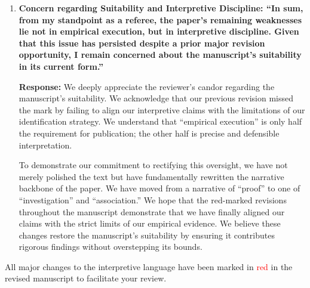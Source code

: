 \documentclass[12pt]{article}
\begin{document}
\begin{enumerate}
    \begin{responsebox}
    \vspace{0.5cm}
    \textbf{Response:} We understood that a fundamental shift in stance was required, not just minor edits. We have revised the manuscript holistically:
    \begin{itemize}
        \item \textbf{Abstract and Introduction:} Completely rewritten to set a cautious tone from the outset.
        \item \textbf{Hypotheses:} Rephrased to reflect associations and potential mechanisms (``is associated with,'' ``may act as'') rather than definitive laws.
        \item \textbf{Discussion of Results:} Checked every instance of ``effect'' and ``impact'' to ensure it is supported by the identification strategy (e.g., using IV results to support stronger claims, but keeping OLS results descriptive).
        \item \textbf{Policy Implications:} Softened recommendations to suggest that policies ``may miss'' the ambiguity channel, rather than asserting they will fail.
    \end{itemize}
    
    \end{responsebox}


    \item \textbf{Concern regarding Suitability and Interpretive Discipline: ``In sum, from my standpoint as a referee, the paper's remaining weaknesses lie not in empirical execution, but in interpretive discipline. Given that this issue has persisted despite a prior major revision opportunity, I remain concerned about the manuscript's suitability in its current form.''}

    \begin{responsebox}
    \vspace{0.5cm}
    \textbf{Response:} We deeply appreciate the reviewer's candor regarding the manuscript's suitability. We acknowledge that our previous revision missed the mark by failing to align our interpretive claims with the limitations of our identification strategy. We understand that ``empirical execution'' is only half the requirement for publication; the other half is precise and defensible interpretation.

    To demonstrate our commitment to rectifying this oversight, we have not merely polished the text but have fundamentally rewritten the narrative backbone of the paper. We have moved from a narrative of ``proof'' to one of ``investigation'' and ``association.'' We hope that the red-marked revisions throughout the manuscript demonstrate that we have finally aligned our claims with the strict limits of our empirical evidence. We believe these changes restore the manuscript's suitability by ensuring it contributes rigorous findings without overstepping its bounds.
    \vspace{0.5cm}
    \end{responsebox}

\end{enumerate}

    All major changes to the interpretive language have been marked in \textcolor{red}{red} in the revised manuscript to facilitate your review.
    \vspace{0.5cm}
\end{document}
